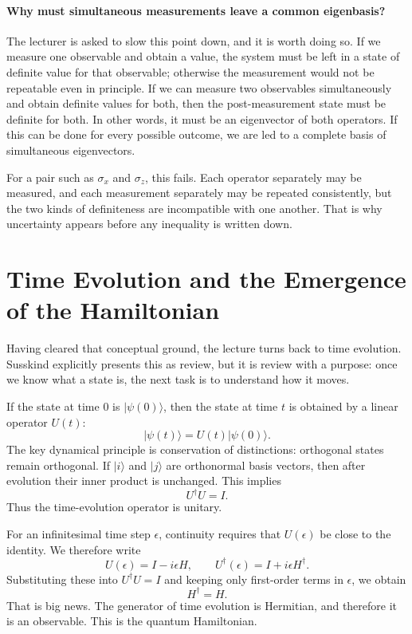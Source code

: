 \paragraph{Why must simultaneous measurements leave a common eigenbasis?}
The lecturer is asked to slow this point down, and it is worth doing so. If we measure one observable and obtain a value, the system must be left in a state of definite value for that observable; otherwise the measurement would not be repeatable even in principle. If we can measure two observables simultaneously and obtain definite values for both, then the post-measurement state must be definite for both. In other words, it must be an eigenvector of both operators. If this can be done for every possible outcome, we are led to a complete basis of simultaneous eigenvectors.

For a pair such as \(\sigma_x\) and \(\sigma_z\), this fails. Each operator separately may be measured, and each measurement separately may be repeated consistently, but the two kinds of definiteness are incompatible with one another. That is why uncertainty appears before any inequality is written down.

\section{Time Evolution and the Emergence of the Hamiltonian}

Having cleared that conceptual ground, the lecture turns back to time evolution. Susskind explicitly presents this as review, but it is review with a purpose: once we know what a state is, the next task is to understand how it moves.

If the state at time \(0\) is \(|\psi(0)\rangle\), then the state at time \(t\) is obtained by a linear operator \(U(t)\):
\begin{equation}
|\psi(t)\rangle = U(t)|\psi(0)\rangle.
\end{equation}
The key dynamical principle is conservation of distinctions: orthogonal states remain orthogonal. If \(|i\rangle\) and \(|j\rangle\) are orthonormal basis vectors, then after evolution their inner product is unchanged. This implies
\begin{equation}
U^\dagger U = I.
\end{equation}
Thus the time-evolution operator is unitary.

For an infinitesimal time step \(\epsilon\), continuity requires that \(U(\epsilon)\) be close to the identity. We therefore write
\begin{equation}
U(\epsilon) = I - i\epsilon H,
\qquad
U^\dagger(\epsilon) = I + i\epsilon H^\dagger.
\end{equation}
Substituting these into \(U^\dagger U = I\) and keeping only first-order terms in \(\epsilon\), we obtain
\begin{equation}
H^\dagger = H.
\end{equation}
That is big news. The generator of time evolution is Hermitian, and therefore it is an observable. This is the quantum Hamiltonian.

